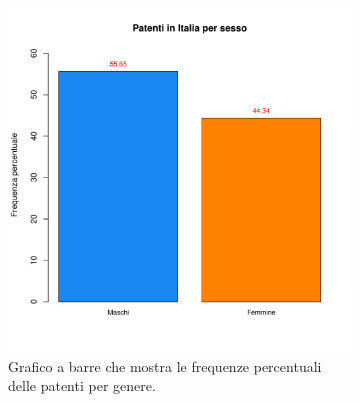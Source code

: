 \documentclass[12pt,a4paper,final,oneside]{article}			%
\begin{document}
        \begin{figure}[h]
        \centering
            \begin{subfigure}{0.5\textwidth}
                
                \includegraphics[scale=0.5]{../results/patenti_per_sesso.pdf}
                \caption{Grafico a barre che mostra le frequenze percentuali delle patenti per genere.}
                \label{Fig: tot_patenti}
            \end{subfigure}
            
            \begin{subfigure}{0.5\textwidth}
                

\end{subfigure}
\end{figure}
\end{document}

